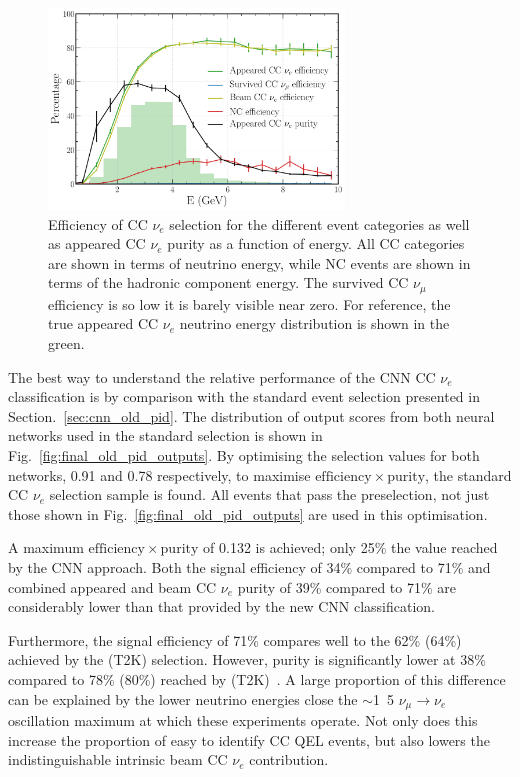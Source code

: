 \begin{figure} %
    \includegraphics[width=0.7\textwidth]{diagrams/7-results/final_nuel_hists.pdf}
    \caption[Efficiency of CC $\nu_{e}$ selection as a function of energy]
    {Efficiency of CC $\nu_{e}$ selection for the different event categories as well as appeared
        CC $\nu_{e}$ purity as a function of energy. All CC categories are shown in terms of
        neutrino energy, while NC events are shown in terms of the hadronic component energy. The
        survived CC $\nu_{\mu}$ efficiency is so low it is barely visible near zero. For
        reference, the true appeared CC $\nu_{e}$ neutrino energy distribution is shown in the
        green.}
    \label{fig:final_nuel_hists}
\end{figure}

The best way to understand the relative performance of the CNN CC $\nu_{e}$ classification is by
comparison with the standard event selection presented in Section.~\ref{sec:cnn_old_pid}. The
distribution of output scores from both neural networks used in the standard selection is shown in
Fig.~\ref{fig:final_old_pid_outputs}. By optimising the selection values for both networks, 0.91
and 0.78 respectively, to maximise $\mathrm{efficiency}\times\mathrm{purity}$, the standard CC
$\nu_{e}$ selection sample is found. All events that pass the preselection, not just those shown
in Fig.~\ref{fig:final_old_pid_outputs} are used in this optimisation.

A maximum $\mathrm{efficiency}\times\mathrm{purity}$ of 0.132 is achieved; only 25\% the value
reached by the CNN approach. Both the signal efficiency of 34\% compared to 71\% and combined
appeared and beam CC $\nu_{e}$ purity of 39\% compared to 71\% are considerably lower than that
provided by the new CNN classification.

Furthermore, the signal efficiency of 71\% compares well to the 62\% (64\%) achieved by the \nova
(T2K) selection. However, purity is significantly lower at 38\% compared to 78\% (80\%) reached by
\nova (T2K)~\cite{acero2019, abe2015}. A large proportion of this difference can be explained by
the lower neutrino energies close the $\sim$\unit{1.5}{\GeV} $\nu_{\mu}\rightarrow\nu_{e}$
oscillation maximum at which these experiments operate. Not only does this increase the proportion
of easy to identify CC QEL events, but also lowers the indistinguishable intrinsic beam CC
$\nu_{e}$ contribution.

